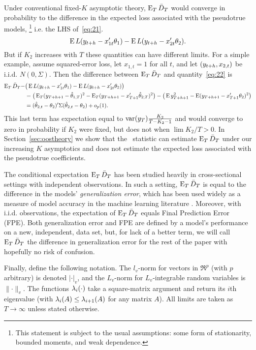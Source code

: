 \documentclass[12pt]{article}
\begin{document}
Under conventional fixed-$K$ asymptotic theory, $\operatorname{E}_T \bar{D}_{T}$ would
converge in probability to the difference in the expected loss
associated with the pseudotrue models,%
\footnote{This statement is subject to the usual assumptions: some
  form of stationarity, bounded moments, and weak dependence.} %
i.e. the LHS of~\eqref{eq:21}.
\begin{equation}\label{eq:22}
  \operatorname{E} L(y_{t+h} - x_{1t}'\theta_{1}) - \operatorname{E} L(y_{t+h} - x_{2t}'\theta_{2}).
\end{equation}
But if $K_2$ increases with $T$ these quantities can have different
limits. For a simple example, assume squared-error loss, let $x_{1,t}
= 1$ for all $t$, and let $(y_{t+h},x_{2,t})$ be i.i.d. $N(0,
\Sigma)$.  Then the difference between $\operatorname{E}_T \bar{D}_{T}$ and
quantity~\eqref{eq:22} is
\begin{align*}
  \operatorname{E}_T \bar{D}_{T} - & \big(\operatorname{E} L(y_{t+h} - x_{1t}'\theta_{1}) - \operatorname{E} L(y_{t+h} - x_{2t}'\theta_{2})\big) \\
  &= \big(\operatorname{E}_T (y_{T+h+1} - \hat\theta_{1,T})^2 - \operatorname{E}_T (y_{T+h+1} - x_{T+1}'\hat\theta_{2,T})^2\big) -
  \big(\operatorname{E} y_{T+h+1}^2 - \operatorname{E} (y_{T+h+1} - x_{T+1}'\theta_2)^2 \big)\\
  &= (\hat\theta_{2,t} - \theta_2)' \Sigma (\hat\theta_{2,t} - \theta_2) + o_p(1).
\end{align*}
This last term has expectation equal to $\operatorname{var}(y_T) \frac{K_2}{T - K_2 - 1}$ and
would converge to zero in probability if $K_2$ were fixed, but does not when $\lim
K_2 / T > 0$. In Section~\ref{sec:oostheory} we show that the \oost\
statistic can estimate $\operatorname{E}_T \bar{D}_{T}$ under our increasing $K$
asymptotics and does not estimate the expected loss associated with
the pseudotrue coefficients.

The conditional expectation $\operatorname{E}_T \bar{D}_{T}$ has been studied heavily in
cross-sectional settings with independent observations. In such a
setting, $\operatorname{E}_T \bar{D}_{T}$ is equal to the difference in the models'
\emph{generalization error}, which has been used widely as a measure
of model accuracy in the machine
learning literature \citep[see][for further discussion]{HTF:08}.
Moreover, with i.i.d. observations, the expectation of $\operatorname{E}_T \bar{D}_{T}$
equals \citepos{Aka:69} Final Prediction Error (FPE). Both
generalization error and FPE are defined by a model's
performance on a new, independent, data set, but, for lack of a better
term, we will call $\operatorname{E}_T \bar{D}_{T}$ the difference in generalization error
for the rest of the paper with hopefully no risk of confusion.

Finally, define the following notation.  The $l_v$-norm for vectors in
$\Re^p$ (with $p$ arbitrary) is denoted $\lvert \cdot \rvert_v$, and
the $L_v$-norm for $L_v$-integrable random variables is $\lVert \cdot
\rVert_v$.  The functions $\operatorname{\lambda}_i(\cdot)$ take a square-matrix
argument and return its $i$th eigenvalue (with $\operatorname{\lambda}_{i}(A) \leq
\operatorname{\lambda}_{i+1}(A)$ for any matrix $A$).  All limits are taken as $T \to
\infty$ unless stated otherwise.
\end{document}

